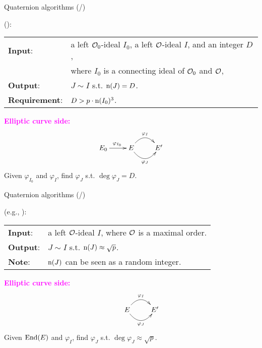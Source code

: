 \begin{frame}{Quaternion algorithms (/\algquatotal{})}

    {\large
    }
    (\cite{AC:DKLPW20}):\\[5pt]
    \begin{tabular}{l l}
        \textbf{Input}: & a left $\mathcal{O}_0$-ideal $I_0$,
                a left $\mathcal{O}$-ideal $I$, and an integer $D$,\\[2pt]
                & where $I_0$ is a connecting ideal of $\mathcal{O}_0$ and $\mathcal{O}$,\\[3pt]
        \textbf{Output}: & $J \sim I$ s.t. $\mathrm{n}(J) = D$.\\[3pt]
        \textbf{Requirement}: & 
                $D > p\cdot\mathrm{n}(I_0)^3$.
    \end{tabular}

    \vspace{15pt}
    \textcolor{magenta}{\textbf{Elliptic curve side:}}
    \begin{align*}
        \xymatrix{
            E_0 \ar[r]^{\varphi_{I_0}}
                & E \ar@/^15pt/[r]^{\varphi_I} \ar@/_15pt/[r]_{\varphi_J}
                & E'
        }
    \end{align*}
    Given $\varphi_{I_0}$ and $\varphi_I$,
    find $\varphi_J$ s.t. $\deg\varphi_J = D$.
\end{frame}

\begin{frame}{Quaternion algorithms (/\algquatotal{})}

    {\large
    }
    (e.g., \cite[Algorithm 2.7.5]{Cohen2010_ccnt}):\\[5pt]
    \begin{tabular}{l l}
        \textbf{Input}: & a left $\mathcal{O}$-ideal $I$,
                            where $\mathcal{O}$ is a maximal order.\\[3pt]
        \textbf{Output}: & $J \sim I$ s.t. $\mathrm{n}(J) \approx \sqrt{p}$.\\[3pt]
        \textbf{Note}: & 
                $\mathrm{n}(J)$ can be seen as a random integer.
    \end{tabular}

    \vspace{15pt}
    \textcolor{magenta}{\textbf{Elliptic curve side:}}
    \begin{align*}
        \xymatrix{
            & E \ar@/^15pt/[r]^{\varphi_I} \ar@/_15pt/[r]_{\varphi_J}
            & E'
        }
    \end{align*}
    Given $\mathrm{End}(E)$ and $\varphi_I$,
    find $\varphi_J$ s.t. $\deg\varphi_J \approx \sqrt{p}$.
\end{frame}

